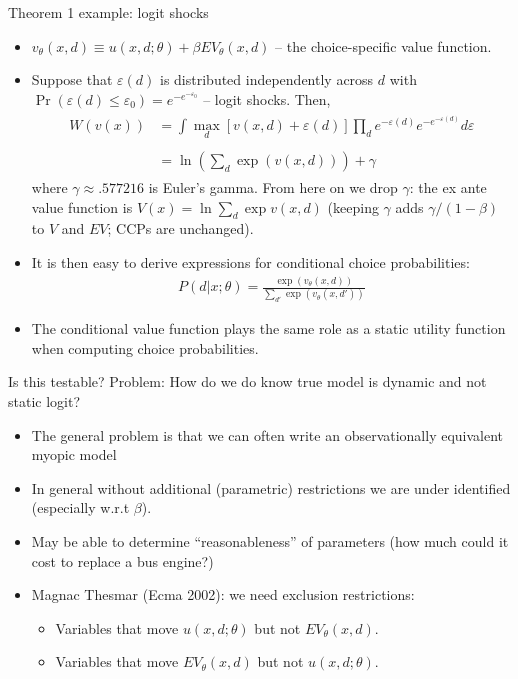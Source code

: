 \documentclass[aspectratio=169,11pt]{beamer}
\begin{document}
\begin{frame}{Theorem 1 example: logit shocks}
\footnotesize
\begin{itemize}
	\item $v_{\theta}\left(x,d\right) \equiv u \left(x,d;\theta\right)+\beta EV_{\theta}\left(x,d\right)$ -- the \alert{choice-specific value function}.

	\smallskip
	\item Suppose that $\varepsilon\left(d\right)$ is distributed independently
	across $d$ with $\Pr\left(\varepsilon\left(d\right)\le\varepsilon_{0}\right)=e^{-e^{-\varepsilon_{0}}}$ -- logit shocks.
	Then,
	\begin{align*}
	\begin{array}{ccl}
	W\left(v\left(x\right)\right) & =
	\int\max_{d}\left[v\left(x,d\right)+\varepsilon\left(d\right)\right]
	\prod_{d}e^{-\varepsilon\left(d\right)}e^{-e^{-\varepsilon\left(d\right)}}d\varepsilon\\
	\\
	 & =  \ln\left(\sum_{d}\exp\left(v\left(x,d\right)\right)\right)+\gamma
	\end{array}
	\end{align*}
	where $\gamma\approx .577216$ is Euler's gamma. From here on we drop $\gamma$: the \alert{ex ante value function} is $V(x) = \ln \sum_d \exp v(x,d)$ (keeping $\gamma$ adds $\gamma/(1-\beta)$ to $V$ and $EV$; CCPs are unchanged).

	\item It is then easy to derive expressions for conditional choice probabilities:
	\begin{align*}
	P\left(d|x;\theta\right)= \frac{\exp\left(v_{\theta}\left(x,d\right)\right)}{\sum_{d'}\exp\left(v_{\theta}\left(x,d'\right)\right)}
	\end{align*}
	\smallskip
	\item The conditional value function plays the same role as a static utility function
	when computing choice probabilities.
\end{itemize}
\end{frame}


\begin{frame}{Is this testable?}
Problem: How do we do know true model is dynamic and not static logit?
\begin{itemize}
\item The general problem is that we can often write an observationally equivalent \alert{myopic model}
\item In general without additional (parametric) restrictions we are under identified (especially w.r.t $\beta$).
\item May be able to determine ``reasonableness'' of parameters (how much could it cost to replace a bus engine?)
\item Magnac Thesmar (Ecma 2002): we need \alert{exclusion restrictions}:
\begin{itemize}
\item Variables that move $u(x,d;\theta)$ but not $EV_{\theta}(x,d)$.
\item Variables that move $EV_{\theta}(x,d)$ but not $u(x,d;\theta)$.
\end{itemize}
\end{itemize}
\end{frame}
\end{document}
